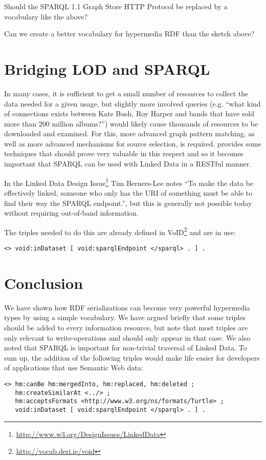 \documentclass{llncs}
\begin{document}
\begin{question}
Should the SPARQL 1.1 Graph Store HTTP Protocol be replaced by a
vocabulary like the above?
\end{question}

\begin{question}
Can we create a better vocabulary for hypermedia RDF than the sketch above?
\end{question}

\section{Bridging LOD and SPARQL}

In many cases, it is sufficient to get a small number of resources to
collect the data needed for a given usage, but slightly more involved
queries (e.g. ``what kind of connections exists between Kate Bush, Roy
Harper and bands that have sold more than 200 million albums?'') would
likely cause thousands of resources to be downloaded and examined. For
this, more advanced graph pattern matching, as well as more advanced
mechanisms for source selection, is
required. \cite{springerlink:10.1007/978-3-642-25073-6-38} provides
some techniques that should prove very valuable in this respect and so
it becomes important that SPARQL can be used with Linked Data in a
RESTful manner.

In the Linked Data Design
Issue\footnote{\url{http://www.w3.org/DesignIssues/LinkedData}} Tim
Berners-Lee notes ``To make the data be effectively linked, someone
who only has the URI of something must be able to find their way the
SPARQL endpoint.'', but this is generally not possible today without
requiring out-of-band information.

The triples needed to do this are already defined in
VoID\footnote{\url{http://vocab.deri.ie/void}} and are in use:
\begin{verbatim}
<> void:inDataset [ void:sparqlEndpoint </sparql> . ] .
\end{verbatim}

\section{Conclusion}

We have shown how RDF serializations can become very powerful
hypermedia types by using a simple vocabulary. We have argued briefly
that some triples should be added to every information resource, but
note that most triples are only relevant to write-operations and
should only appear in that case. We also noted that SPARQL is
important for non-trivial traversal of Linked Data. To sum up, the
addition of the following triples would make life easier for
developers of applications that use Semantic Web data:

\begin{verbatim}
<> hm:canBe hm:mergedInto, hm:replaced, hm:deleted ;
   hm:createSimilarAt <../> ;
   hm:acceptsFormats <http://www.w3.org/ns/formats/Turtle> ;
   void:inDataset [ void:sparqlEndpoint </sparql> . ] .
\end{verbatim}


%
%

\end{document}
